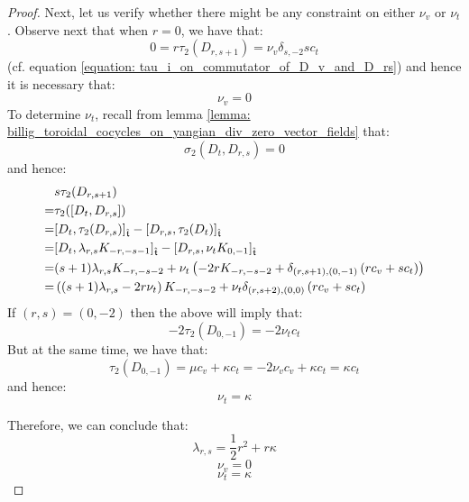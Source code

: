 \begin{proof}
                Next, let us verify whether there might be any constraint on either $\nu_v$ or $\nu_t$. Observe next that when $r = 0$, we have that:
                    $$0 = r \tau_2(D_{r, s + 1}) = \nu_v \delta_{s, -2} sc_t$$
                (cf. equation \eqref{equation: tau_i_on_commutator_of_D_v_and_D_rs}) and hence it is necessary that:
                    $$\nu_v = 0$$
                To determine $\nu_t$, recall from lemma \ref{lemma: billig_toroidal_cocycles_on_yangian_div_zero_vector_fields} that:
                    $$\sigma_2(D_t, D_{r, s}) = 0$$
                and hence:
                    $$
                        \begin{aligned}
                            & s \tau_2(D_{r, s + 1})
                            \\
                            = & \tau_2([D_t, D_{r, s}])
                            \\
                            = & [D_t, \tau_2(D_{r, s})]_{\hat{\mathfrak{t}}} - [D_{r, s}, \tau_2(D_t)]_{\hat{\mathfrak{t}}} 
                            \\
                            = & [D_t, \lambda_{r, s} K_{-r, -s - 1}]_{\hat{\mathfrak{t}}} - [D_{r, s}, \nu_t K_{0, -1}]_{\hat{\mathfrak{t}}}
                            \\
                            = & (s + 1) \lambda_{r, s} K_{-r, -s - 2} + \nu_t \left( -2r K_{-r, -s - 2} + \delta_{(r, s + 1), (0, -1)} \left( r c_v + s c_t \right) \right)
                            \\
                            = & \left( (s + 1) \lambda_{r, s} - 2r \nu_t \right) K_{-r, -s - 2} + \nu_t \delta_{(r, s + 2), (0, 0)} \left( r c_v + s c_t \right)
                        \end{aligned}
                    $$
                If $(r, s) = (0, -2)$ then the above will imply that:
                    $$-2\tau_2(D_{0, -1}) = -2\nu_t c_t$$
                But at the same time, we have that:
                    $$\tau_2(D_{0, -1}) = \mu c_v + \kappa c_t = -2\nu_v c_v + \kappa c_t = \kappa c_t$$
                and hence:
                    $$\nu_t = \kappa$$
                    
                Therefore, we can conclude that:
                    \begin{equation} \label{equation: lambda_rs_formula}
                        \lambda_{r, s} = \frac12 r^2 + r\kappa
                    \end{equation}
                    $$\nu_v = 0$$
                    $$\nu_t = \kappa$$
            \end{proof}
